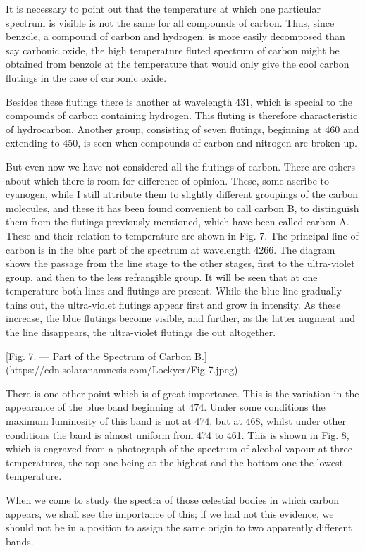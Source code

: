 \documentclass[a4paper, 12pt, oneside, polutonikogreek, english]{article}
\begin{document}
It is necessary to point out that the temperature at which one particular spectrum is visible is not the same for all compounds of carbon. Thus, since benzole, a compound of carbon and hydrogen, is more easily decomposed than say carbonic oxide, the high temperature fluted spectrum of carbon might be obtained from benzole at the temperature that would only give the cool carbon flutings in the case of carbonic oxide.

Besides these flutings there is another at wavelength 431, which is special to the compounds of carbon containing hydrogen. This fluting is therefore characteristic of hydrocarbon. Another group, consisting of seven flutings, beginning at 460 and extending to 450, is seen when compounds of carbon and nitrogen are broken up.

But even now we have not considered all the flutings of carbon. There are others about which there is room for difference of opinion. These, some ascribe to cyanogen, while I still attribute them to slightly different groupings of the carbon molecules, and these it has been found convenient to call carbon B, to distinguish them from the flutings previously mentioned, which have been called carbon A. These and their relation to temperature are shown in Fig. 7. The principal line of carbon is in the blue part of the spectrum at wavelength 4266. The diagram shows the passage from the line stage to the other stages, first to the ultra-violet group, and then to the less refrangible group. It will be seen that at one temperature both lines and flutings are present. While the blue line gradually thins out, the ultra-violet flutings appear first and grow in intensity. As these increase, the blue flutings become visible, and further, as the latter augment and the line disappears, the ultra-violet flutings die out altogether.

[Fig. 7. --- Part of the Spectrum of Carbon B.](https://cdn.solaranamnesis.com/Lockyer/Fig-7.jpeg)

There is one other point which is of great importance. This is the variation in the appearance of the blue band beginning at 474. Under some conditions the maximum luminosity of this band is not at 474, but at 468, whilst under other conditions the band is almost uniform from 474 to 461. This is shown in Fig. 8, which is engraved from a photograph of the spectrum of alcohol vapour at three temperatures, the top one being at the highest and the bottom one the lowest temperature.

When we come to study the spectra of those celestial bodies in which carbon appears, we shall see the importance of this; if we had not this evidence, we should not be in a position to assign the same origin to two apparently different bands.
\end{document}
